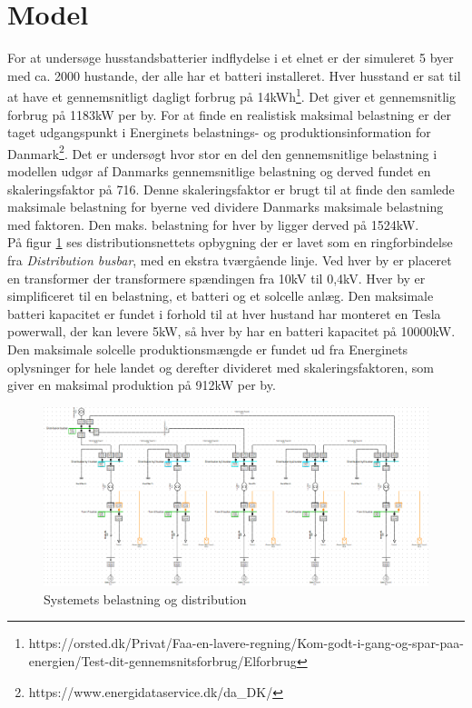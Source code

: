 

\label{Modelopbygning}

\section{Model}

For at undersøge husstandsbatterier indflydelse i et elnet er der simuleret 5 byer med ca. 2000 hustande, der alle har et batteri installeret. Hver husstand er sat til at have et gennemsnitligt dagligt forbrug på 14kWh\footnote{https://orsted.dk/Privat/Faa-en-lavere-regning/Kom-godt-i-gang-og-spar-paa-energien/Test-dit-gennemsnitsforbrug/Elforbrug}. Det giver et gennemsnitlig forbrug på 1183kW per by. For at finde en realistisk maksimal belastning er der taget udgangspunkt i Energinets belastnings- og produktionsinformation for Danmark\footnote{https://www.energidataservice.dk/da\_DK/}. Det er undersøgt hvor stor en del den gennemsnitlige belastning i modellen udgør af Danmarks gennemsnitlige belastning og derved fundet en skaleringsfaktor på 716. Denne skaleringsfaktor er brugt til at finde den samlede maksimale belastning for byerne ved dividere Danmarks maksimale belastning med faktoren. Den maks. belastning for hver by ligger derved på 1524kW. \\
På figur \ref{fig:Simdis} ses distributionsnettets opbygning der er lavet som en ringforbindelse fra \textit{Distribution busbar}, med en ekstra tværgående linje. Ved hver by er placeret en transformer der transformere spændingen fra 10kV til 0,4kV. Hver by er simplificeret til en belastning, et batteri og et solcelle anlæg. Den maksimale batteri kapacitet er fundet i forhold til at hver hustand har monteret en Tesla powerwall, der kan levere 5kW, så hver by har en batteri kapacitet på 10000kW. Den maksimale solcelle produktionsmængde er fundet ud fra Energinets oplysninger for hele landet og derefter divideret med skaleringsfaktoren, som giver en maksimal produktion på 912kW per by. 

 
 \begin{figure}[H] %
 	\centering
 	\includegraphics[width=1\textwidth]{figurer/Sim_model_2}
 	\caption{Systemets belastning og distribution}
 	\label{fig:Simdis}
 \end{figure}
    

